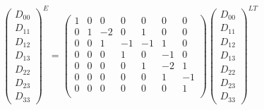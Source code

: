 \begin{equation}
\begin{pmatrix}D_{00}\\D_{11}\\D_{12}\\D_{13}\\D_{22}\\D_{23}\\D_{33}\end{pmatrix}^{E} =
\begin{pmatrix}
 1 & 0 & 0 & 0 & 0 & 0 & 0 \\
 0 & 1 & -2 & 0 & 1 & 0 & 0 \\
 0 & 0 & 1 & -1 & -1 & 1 & 0 \\
 0 & 0 & 0 & 1 & 0 & -1 & 0 \\
 0 & 0 & 0 & 0 & 1 & -2 & 1 \\
 0 & 0 & 0 & 0 & 0 & 1 & -1 \\
 0 & 0 & 0 & 0 & 0 & 0 & 1 \\
\end{pmatrix}
\begin{pmatrix}D_{00}\\D_{11}\\D_{12}\\D_{13}\\D_{22}\\D_{23}\\D_{33}\end{pmatrix}^{LT}
\end{equation}
